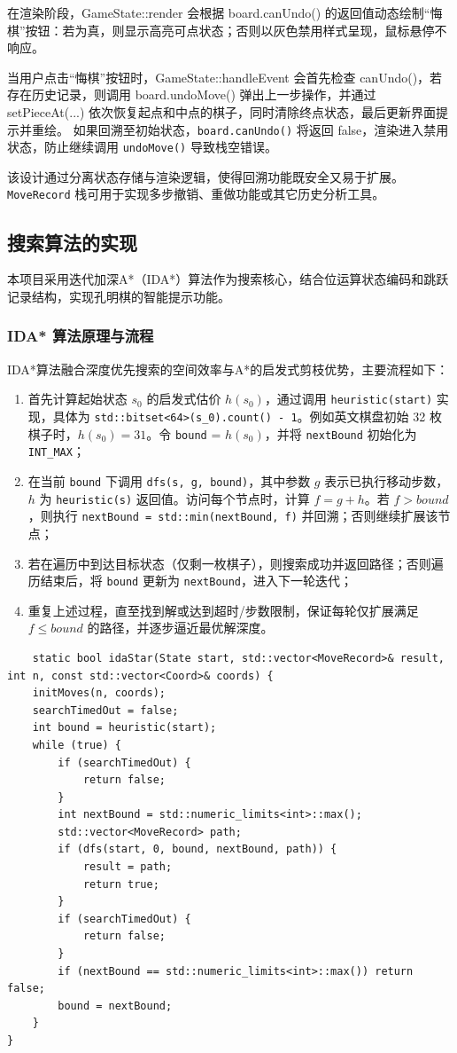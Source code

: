 \documentclass[12pt, a4paper]{article}
\begin{document}
在渲染阶段，GameState::render 会根据 board.canUndo() 的返回值动态绘制“悔棋”按钮：若为真，则显示高亮可点状态；否则以灰色禁用样式呈现，鼠标悬停不响应。

当用户点击“悔棋”按钮时，GameState::handleEvent 会首先检查 canUndo()，若存在历史记录，则调用 board.undoMove() 弹出上一步操作，并通过 setPieceAt(...) 依次恢复起点和中点的棋子，同时清除终点状态，最后更新界面提示并重绘。
如果回溯至初始状态，\texttt{board.canUndo()} 将返回 false，渲染进入禁用状态，防止继续调用 \texttt{undoMove()} 导致栈空错误。

该设计通过分离状态存储与渲染逻辑，使得回溯功能既安全又易于扩展。\texttt{MoveRecord} 栈可用于实现多步撤销、重做功能或其它历史分析工具。

\subsection{搜索算法的实现}
本项目采用迭代加深A*（IDA*）算法作为搜索核心，结合位运算状态编码和跳跃记录结构，实现孔明棋的智能提示功能。

\subsubsection{IDA* 算法原理与流程}
IDA*算法融合深度优先搜索的空间效率与A*的启发式剪枝优势，主要流程如下：
\begin{enumerate}
  \item 首先计算起始状态 $s_0$ 的启发式估价 $h(s_0)$，通过调用 \texttt{heuristic(start)} 实现，具体为 \texttt{std::bitset<64>(s\_0).count() - 1}。例如英文棋盘初始 32 枚棋子时，$h(s_0)=31$。令 \texttt{bound} = $h(s_0)$，并将 \texttt{nextBound} 初始化为 \texttt{INT\_MAX}；
  \item 在当前 \verb|bound| 下调用 \verb|dfs(s, g, bound)|，其中参数 $g$ 表示已执行移动步数，$h$ 为 \verb|heuristic(s)| 返回值。访问每个节点时，计算 $f = g + h$。若 $f > bound$，则执行 \verb|nextBound = std::min(nextBound, f)| 并回溯；否则继续扩展该节点；
  \item 若在遍历中到达目标状态（仅剩一枚棋子），则搜索成功并返回路径；否则遍历结束后，将 \verb|bound| 更新为 \verb|nextBound|，进入下一轮迭代；
  \item 重复上述过程，直至找到解或达到超时/步数限制，保证每轮仅扩展满足 $f \le bound$ 的路径，并逐步逼近最优解深度。
\end{enumerate}

\begin{lstlisting}
    static bool idaStar(State start, std::vector<MoveRecord>& result, int n, const std::vector<Coord>& coords) {
    initMoves(n, coords);
    searchTimedOut = false;
    int bound = heuristic(start);
    while (true) {
        if (searchTimedOut) {
            return false;
        }
        int nextBound = std::numeric_limits<int>::max();
        std::vector<MoveRecord> path;
        if (dfs(start, 0, bound, nextBound, path)) {
            result = path;
            return true;
        }
        if (searchTimedOut) {
            return false;
        }
        if (nextBound == std::numeric_limits<int>::max()) return false;
        bound = nextBound;
    }
}
\end{lstlisting}
\end{document}
